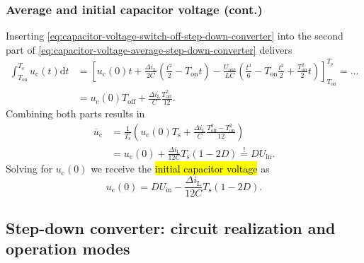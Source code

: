\begin{frame}
    \frametitle{Average and initial capacitor voltage (cont.)}
     Inserting \eqref{eq:capacitor-voltage-switch-off-step-down-converter} into the second part of \eqref{eq:capacitor-voltage-average-step-down-converter} delivers
    \begin{equation}
        \begin{split}
            \int_{T_\mathrm{on}}^{T_\mathrm{s}} u_\mathrm{c}(t) \mathrm{d}t &= \left[u_\mathrm{c}(0)t +  \frac{\Delta i_\mathrm{L}}{2C}(\frac{t^2}{2} - T_\mathrm{on}t) - \frac{U_\mathrm{out}}{LC}(\frac{t^3}{6} - T_\mathrm{on}\frac{t^2}{2} + \frac{T_\mathrm{on}^2}{2}t)  \right]_{T_\mathrm{on}}^{T_\mathrm{s}} =\ldots \\ &= u_\mathrm{c}(0) T_\mathrm{off} + \frac{\Delta i_\mathrm{L}}{C}\frac{T_\mathrm{off}^2}{12}.
        \end{split}
    \end{equation}
    Combining both parts results in
    \begin{equation}
    \begin{split}
        \overline{u}_\mathrm{c} &= \frac{1}{T_\mathrm{s}}\left(u_\mathrm{c}(0)T_\mathrm{s} + \frac{\Delta i_\mathrm{L}}{C}\frac{T_\mathrm{off}^2-T_\mathrm{on}^2}{12} \right)\\
                                & = u_\mathrm{c}(0) + \frac{\Delta i_\mathrm{L}}{12C}T_\mathrm{s}(1-2D) \stackrel{!}{=} D U_\mathrm{in}.
        \end{split}
    \end{equation}
    Solving for $u_\mathrm{c}(0)$ we receive the \hl{initial capacitor voltage} as
    \begin{equation}
        u_\mathrm{c}(0) = D U_\mathrm{in} - \frac{\Delta i_\mathrm{L}}{12C}T_\mathrm{s}(1-2D).
    \end{equation}
\end{frame}

\subsection{Step-down converter: circuit realization and operation modes}

